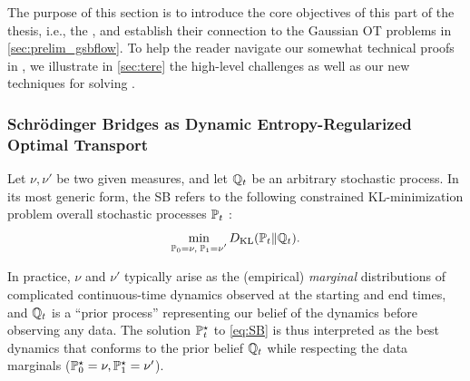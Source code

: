 The purpose of this section is to introduce the core objectives of this part of the thesis, i.e., the , and establish their connection to the Gaussian \acrshort{OT} problems in \cref{sec:prelim_gsbflow}. To help the reader navigate our somewhat technical proofs in ,  we illustrate in \cref{sec:tere} the high-level challenges as well as our new techniques for solving .

\subsubsection{Schr{\"o}dinger Bridges as Dynamic Entropy-Regularized Optimal Transport}


Let $\nu, \nu'$ be two given measures, and let $\refpro$ be an arbitrary stochastic process. In its most generic form, the \acrlong{SB} refers to the following constrained KL-minimization problem overall stochastic processes $\Pmargin$ \citep{leonard2013survey, chen2021stochastic}: 
\begin{equation}
\label{eq:SB}
\min_{ \substack{ \Pinit = \nu, \; \Pend = \nu'} } \KL(\Pmargin \|\refpro).%
\end{equation}


In practice, $\nu$ and $\nu'$ typically arise as the (empirical) \emph{marginal} distributions of complicated continuous-time dynamics observed at the starting and end times, and $\refpro$ is a ``prior process'' representing our belief of the dynamics before observing any data. The solution $\Pstar$ to \eqref{eq:SB} is thus interpreted as the best dynamics that conforms to the prior belief $\refpro$ while respecting the data marginals ($\Pstar[0] = \nu, \Pstar[\horizon] = \nu'$). 

